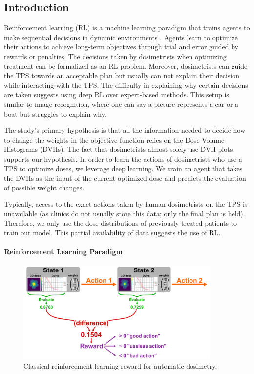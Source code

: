 \subsection{Introduction}
Reinforcement learning (RL) is a machine learning paradigm that trains agents to make sequential decisions in dynamic environments \cite{brooks_what_2021}.
Agents learn to optimize their actions to achieve long-term objectives through trial and error guided by rewards or penalties.
The decisions taken by dosimetrists when optimizing treatment can be formalized as an RL problem.
Moreover, dosimetrists can guide the TPS towards an acceptable plan but usually can not explain their decision while interacting with the TPS.
The difficulty in explaining why certain decisions are taken suggests using deep RL over expert-based methods.
This setup is similar to image recognition, where one can say a picture represents a car or a boat but struggles to explain why.

The study’s primary hypothesis is that all the information needed to decide how to change the weights in the objective function relies on the Dose Volume Histograms (DVHs).
The fact that dosimetrists almost solely use DVH plots supports our hypothesis.
In order to learn the actions of dosimetrists who use a TPS to optimize doses, we leverage deep learning.
We train an agent that takes the DVHs as the input of the current optimized dose and predicts the evaluation of possible weight changes.

Typically, access to the exact actions taken by human dosimetrists on the TPS is unavailable (as clinics do not usually store this data; only the final plan is held).
Therefore, we only use the dose distributions of previously treated patients to train our model.
This partial availability of data suggests the use of RL.

\paragraph{Reinforcement Learning Paradigm}
\begin{figure}
	\centering
	\includegraphics[width=0.9\textwidth]{AIME/reward.pdf}
	\caption{Classical reinforcement learning reward for automatic dosimetry.}
	\label{fig:reward_fig}
\end{figure}

